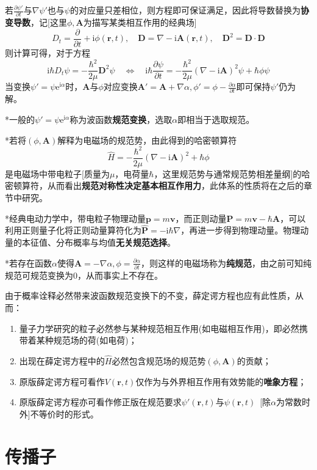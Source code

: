 \documentclass[a4paper,UTF8,fontset=windows]{ctexart}
\newcommand*{\ir}{\mathrm{i}}
\newcommand*{\er}{\mathrm{e}}
\newcommand*{\br}{\mathbf{r}}
\newcommand*{\ba}{\mathbf{A}}
\begin{document}
若$\frac{\partial\psi'}{\partial t}$与$\nabla\psi'$也与$\psi$的对应量只差相位，则方程即可保证满足，因此将导数替换为\textbf{协变导数}，记[这里$\phi,\ba$为描写某类相互作用的经典场]
$$D_t=\frac{\partial}{\partial t}+\ir\phi(\br,t),\quad\mathbf{D}=\nabla-\ir\ba(\br,t),\quad\mathbf{D}^2=\mathbf{D}\cdot\mathbf{D}$$
则计算可得，对于方程
$$\ir\hbar D_t\psi=-\frac{\hbar^2}{2\mu}\mathbf{D}^2\psi\quad\Leftrightarrow\quad\ir\hbar\frac{\partial\psi}{\partial t}=-\frac{\hbar^2}{2\mu}(\nabla-\ir\ba)^2\psi+\hbar\phi\psi$$
当变换$\psi'=\psi\er^{\ir\alpha}$时，$\ba$与$\phi$对应变换$\ba'=\ba+\nabla\alpha,\phi'=\phi-\frac{\partial\alpha}{\partial t}$即可保持$\psi'$仍为解。

*一般的$\psi'=\psi\er^{\ir\alpha}$称为波函数\textbf{规范变换}，选取$\alpha$即相当于选取规范。

*若将$(\phi,\ba)$解释为电磁场的规范势，由此得到的哈密顿算符
$$\hat{H}=-\frac{\hbar^2}{2\mu}(\nabla-\ir\ba)^2+\hbar\phi$$
是电磁场中带电粒子[质量为$\mu$，电荷量$\hbar$，这里规范势与通常规范势相差量纲]的哈密顿算符，从而看出\textbf{规范对称性决定基本相互作用力}，此体系的性质将在之后的章节中研究。

*经典电动力学中，带电粒子物理动量$\mathbf{p}=m\mathbf{v}$，而正则动量$\mathbf{P}=m\mathbf{v}-\hbar\ba$，可以利用正则量子化将正则动量算符化为$\hat{\mathbf{P}}=-\ir\hbar\nabla$，再进一步得到物理动量。物理动量的本征值、分布概率与均值\textbf{无关规范选择}。

*若存在函数$\alpha$使得$\ba=-\nabla\alpha,\phi=\frac{\partial\alpha}{\partial t}$，则这样的电磁场称为\textbf{纯规范}，由之前可知纯规范可规范变换为0，从而事实上不存在。

由于概率诠释必然带来波函数规范变换下的不变，薛定谔方程也应有此性质，从而：
\begin{enumerate}
    \item 量子力学研究的粒子必然参与某种规范相互作用(如电磁相互作用)，即必然携带着某种规范场的荷(如电荷)；
    \item 出现在薛定谔方程中的$\hat{H}$必然包含规范场的规范势$(\phi,\ba)$的贡献；
    \item 原版薛定谔方程可看作$V(\br,t)$仅作为与外界相互作用有效势能的\textbf{唯象方程}；
    \item 原版薛定谔方程亦可看作修正版在规范要求$\psi'(\br,t)$与$\psi(\br,t)$\ [除$\alpha$为常数时外]不等价时的形式。
\end{enumerate}

\section{传播子}
\end{document}
